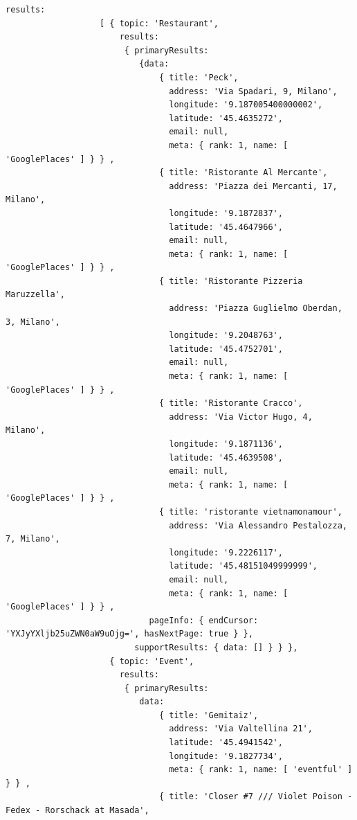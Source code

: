 \begin{itemize}
\end{itemize}

\begin{lstlisting}[backgroundcolor = \color{lightgray},
								caption = Esempio Data Store Mashup,
								label = lst:store-two-topics]
				results: 
				   [ { topic: 'Restaurant',
				       results: 
				        { primaryResults: 
				           {data: 
			                   { title: 'Peck',
			                     address: 'Via Spadari, 9, Milano',
			                     longitude: '9.187005400000002',
			                     latitude: '45.4635272',
			                     email: null,
			                     meta: { rank: 1, name: [ 'GooglePlaces' ] } } ,
			                   { title: 'Ristorante Al Mercante',
			                     address: 'Piazza dei Mercanti, 17, Milano',
			                     longitude: '9.1872837',
			                     latitude: '45.4647966',
			                     email: null,
			                     meta: { rank: 1, name: [ 'GooglePlaces' ] } } ,
			                   { title: 'Ristorante Pizzeria Maruzzella',
			                     address: 'Piazza Guglielmo Oberdan, 3, Milano',
			                     longitude: '9.2048763',
			                     latitude: '45.4752701',
			                     email: null,
			                     meta: { rank: 1, name: [ 'GooglePlaces' ] } } ,
			                   { title: 'Ristorante Cracco',
			                     address: 'Via Victor Hugo, 4, Milano',
			                     longitude: '9.1871136',
			                     latitude: '45.4639508',
			                     email: null,
			                     meta: { rank: 1, name: [ 'GooglePlaces' ] } } ,
			                   { title: 'ristorante vietnamonamour',
			                     address: 'Via Alessandro Pestalozza, 7, Milano',
			                     longitude: '9.2226117',
			                     latitude: '45.48151049999999',
			                     email: null,
			                     meta: { rank: 1, name: [ 'GooglePlaces' ] } } ,
				             pageInfo: { endCursor: 'YXJyYXljb25uZWN0aW9uOjg=', hasNextPage: true } },
				          supportResults: { data: [] } } },
				     { topic: 'Event',
				       results: 
				        { primaryResults: 
				           data:
			                   { title: 'Gemitaiz',
			                     address: 'Via Valtellina 21',
			                     latitude: '45.4941542',
			                     longitude: '9.1827734',
			                     meta: { rank: 1, name: [ 'eventful' ] } } ,
			                   { title: 'Closer #7 /// Violet Poison - Fedex - Rorschack at Masada',

\end{lstlisting}
